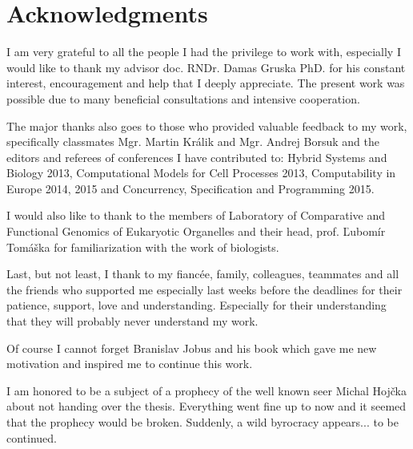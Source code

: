 \chapter*{Acknowledgments}

I am very grateful to all the people I had the privilege to work with, especially I would like to thank my advisor doc. RNDr. Damas Gruska PhD. for his constant interest, encouragement and help that I deeply appreciate.
The present work was possible due to many beneficial consultations and intensive cooperation.

The major thanks also goes to those who provided valuable feedback to my work, specifically classmates Mgr. Martin Králik and Mgr. Andrej Borsuk and the editors and referees of conferences I have contributed to: Hybrid Systems and Biology 2013, Computational Models for Cell Processes 2013, Computability in Europe 2014, 2015 and Concurrency, Specification and Programming 2015.

I would also like to thank to the members of Laboratory of Comparative and Functional Genomics of Eukaryotic Organelles and their head, prof. Ľubomír Tomáška for familiarization with the work of biologists.

Last, but not least, I thank to my fiancée, family, colleagues, teammates and all the friends who supported me especially last weeks before the deadlines for their patience, support, love and understanding.
\ifdefined\godzilla
  Especially for their understanding that they will probably never understand my work.

  Of course I cannot forget Branislav Jobus and his book \cite{Jobus10Ancijas} which gave me new motivation and inspired me to continue this work.

  I am honored to be a subject of a prophecy of the well known seer Michal Hojčka about not handing over the thesis. Everything went fine up to now and it seemed that the prophecy would be broken. Suddenly, a wild byrocracy appears... to be continued.  
\fi
